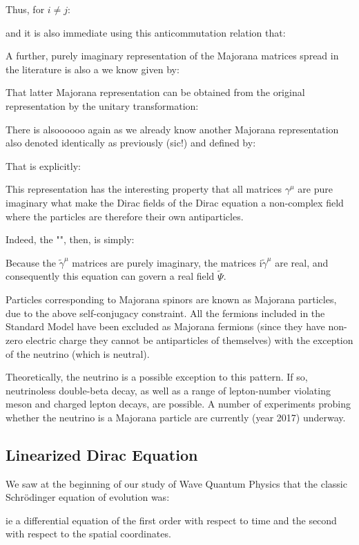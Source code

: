 	Thus, for $i\neq j$:
	
	and it is also immediate using this anticommutation relation that:
	
	A further, purely imaginary representation of the Majorana matrices spread in the literature is also a we know given by:
	
	That latter Majorana representation can be obtained from the original representation by the unitary transformation:
	
	There is alsoooooo again as we already know another Majorana representation also denoted identically as previously (sic!) and defined by:
	
	That is explicitly:
	
	This representation has the interesting property that all matrices $\gamma^\mu$ are pure imaginary what make the Dirac fields of the Dirac equation a non-complex field where the particles are therefore their own antiparticles.
	
	Indeed, the "", then, is simply:
	
	Because the $\tilde{\gamma}^\mu$ matrices are purely imaginary, the matrices $\mathrm{i}\tilde{\gamma}^\mu$ are real, and consequently this equation can govern a real field $\tilde{\Psi}$.
	
	Particles corresponding to Majorana spinors are known as Majorana particles, due to the above self-conjugacy constraint. All the fermions included in the Standard Model have been excluded as Majorana fermions (since they have non-zero electric charge they cannot be antiparticles of themselves) with the exception of the neutrino (which is neutral).

	Theoretically, the neutrino is a possible exception to this pattern. If so, neutrinoless double-beta decay, as well as a range of lepton-number violating meson and charged lepton decays, are possible. A number of experiments probing whether the neutrino is a Majorana particle are currently (year 2017) underway.
	
	\pagebreak
	\subsection{Linearized Dirac Equation}\label{linearized dirac equation}
	We saw at the beginning of our study of Wave Quantum Physics that the classic Schrödinger equation of evolution was:
	
	ie a differential equation of the first order with respect to time and the second with respect to the spatial coordinates.

